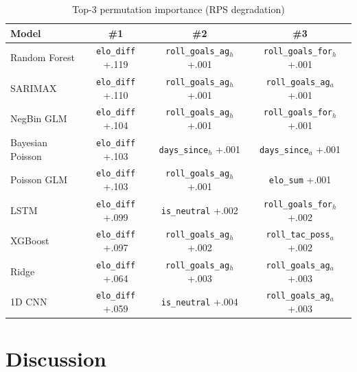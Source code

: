 \documentclass[conference]{IEEEtran}
\begin{document}
\begin{table}[t]
  \caption{Top-3 permutation importance (RPS degradation)}
  \label{tab:importance}
  \small
  \begin{tabular}{@{}lccc@{}}
    \toprule
    Model & \#1 & \#2 & \#3 \\
    \midrule
    Random Forest & \texttt{elo\_diff} \scriptsize{+.119}
      & \texttt{roll\_goals\_ag$_h$} \scriptsize{+.001}
      & \texttt{roll\_goals\_for$_h$} \scriptsize{+.001} \\
    SARIMAX & \texttt{elo\_diff} \scriptsize{+.110}
      & \texttt{roll\_goals\_ag$_h$} \scriptsize{+.001}
      & \texttt{roll\_goals\_ag$_a$} \scriptsize{+.001} \\
    NegBin GLM & \texttt{elo\_diff} \scriptsize{+.104}
      & \texttt{roll\_goals\_ag$_h$} \scriptsize{+.001}
      & \texttt{roll\_goals\_for$_h$} \scriptsize{+.001} \\
    Bayesian Poisson & \texttt{elo\_diff} \scriptsize{+.103}
      & \texttt{days\_since$_h$} \scriptsize{+.001}
      & \texttt{days\_since$_a$} \scriptsize{+.001} \\
    Poisson GLM & \texttt{elo\_diff} \scriptsize{+.103}
      & \texttt{roll\_goals\_ag$_h$} \scriptsize{+.001}
      & \texttt{elo\_sum} \scriptsize{+.001} \\
    LSTM & \texttt{elo\_diff} \scriptsize{+.099}
      & \texttt{is\_neutral} \scriptsize{+.002}
      & \texttt{roll\_goals\_for$_h$} \scriptsize{+.002} \\
    XGBoost & \texttt{elo\_diff} \scriptsize{+.097}
      & \texttt{roll\_goals\_ag$_h$} \scriptsize{+.002}
      & \texttt{roll\_tac\_poss$_a$} \scriptsize{+.002} \\
    Ridge & \texttt{elo\_diff} \scriptsize{+.064}
      & \texttt{roll\_goals\_ag$_h$} \scriptsize{+.003}
      & \texttt{roll\_goals\_ag$_a$} \scriptsize{+.003} \\
    1D CNN & \texttt{elo\_diff} \scriptsize{+.059}
      & \texttt{is\_neutral} \scriptsize{+.004}
      & \texttt{roll\_goals\_ag$_a$} \scriptsize{+.003} \\
    \bottomrule
  \end{tabular}
\end{table}

\section{Discussion}
\label{sec:discussion}
\end{document}
